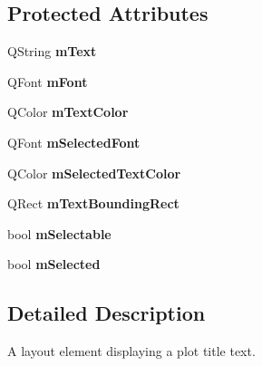 \subsection*{\-Protected \-Attributes}
\begin{DoxyCompactItemize}
\item 
\hypertarget{classQCPPlotTitle_a0d961bfac1211d59d3b0bc30d35f6379}{\-Q\-String {\bfseries m\-Text}}\label{classQCPPlotTitle_a0d961bfac1211d59d3b0bc30d35f6379}

\item 
\hypertarget{classQCPPlotTitle_ad9e2c2a2e941f3444cb692a51df0df62}{\-Q\-Font {\bfseries m\-Font}}\label{classQCPPlotTitle_ad9e2c2a2e941f3444cb692a51df0df62}

\item 
\hypertarget{classQCPPlotTitle_a5d7f834d6522c1a72fb0682c0b7ebe13}{\-Q\-Color {\bfseries m\-Text\-Color}}\label{classQCPPlotTitle_a5d7f834d6522c1a72fb0682c0b7ebe13}

\item 
\hypertarget{classQCPPlotTitle_a95003186c39bbab902873a8ef4cbb547}{\-Q\-Font {\bfseries m\-Selected\-Font}}\label{classQCPPlotTitle_a95003186c39bbab902873a8ef4cbb547}

\item 
\hypertarget{classQCPPlotTitle_a8b9760e62af92814c4effdd7ad69c5f9}{\-Q\-Color {\bfseries m\-Selected\-Text\-Color}}\label{classQCPPlotTitle_a8b9760e62af92814c4effdd7ad69c5f9}

\item 
\hypertarget{classQCPPlotTitle_a7178a0f6c1e633c144c17b4de4e0b840}{\-Q\-Rect {\bfseries m\-Text\-Bounding\-Rect}}\label{classQCPPlotTitle_a7178a0f6c1e633c144c17b4de4e0b840}

\item 
\hypertarget{classQCPPlotTitle_aadefb5e2b19b1cc7deda0a55ec747884}{bool {\bfseries m\-Selectable}}\label{classQCPPlotTitle_aadefb5e2b19b1cc7deda0a55ec747884}

\item 
\hypertarget{classQCPPlotTitle_afef1342a20f5ca985a20b9cfdc03d815}{bool {\bfseries m\-Selected}}\label{classQCPPlotTitle_afef1342a20f5ca985a20b9cfdc03d815}

\end{DoxyCompactItemize}


\subsection{\-Detailed \-Description}
\-A layout element displaying a plot title text. 

